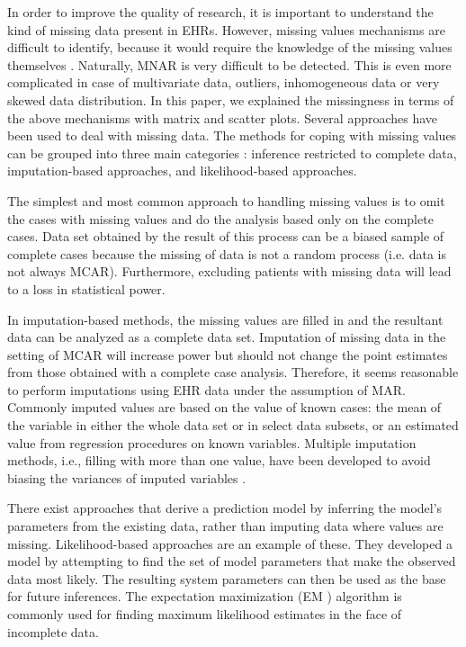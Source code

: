 \documentclass{amia}
\begin{document}
In order to improve the quality of research, it is important to understand the kind of missing data present in EHRs. However, missing values mechanisms are difficult to identify, because it would require the knowledge of the missing values themselves \cite{little2014statistical}. Naturally, MNAR is very difficult to be detected. This is even more complicated in case of multivariate data, outliers, inhomogeneous data or very skewed data distribution. In this paper, we explained the missingness in terms of the above mechanisms with matrix and scatter plots. Several approaches have been used to deal with missing data. The methods for coping with missing values can be grouped into three main categories \cite{little2014statistical}: inference restricted to complete data, imputation-based approaches, and likelihood-based approaches.

The simplest and most common approach to handling missing values is to omit the cases with missing values and do the analysis based only on the complete cases. Data set obtained by the result of this process can be a biased sample of complete cases because the missing of data is not a random process (i.e. data is not always MCAR). Furthermore, excluding patients with missing data will lead to a loss in statistical power. 

In imputation-based methods, the missing values are filled in and the resultant data can be analyzed as a complete data set. Imputation of missing data in the setting of MCAR will increase power but should not change the point estimates from those obtained with a complete case analysis. Therefore, it seems reasonable to perform imputations using EHR data under the assumption of MAR. Commonly imputed values are based on the value of known cases: the mean of the variable in either the whole data set or in select data subsets, or an estimated value from regression procedures on known variables. Multiple imputation methods, i.e., filling with more than one value, have been developed to avoid biasing the variances of imputed variables \cite{enders2006primer}.

There exist approaches that derive a prediction model by inferring the model's parameters from the existing data, rather than imputing data where values are missing. Likelihood-based approaches are an example of these. They developed a model by attempting to find the set of model parameters that make the observed data most likely. The resulting system parameters can then be used as the base for future inferences. The expectation maximization (EM \cite{dempster1977maximum}) algorithm is commonly used for finding maximum likelihood estimates in the face of incomplete data.
\end{document}
